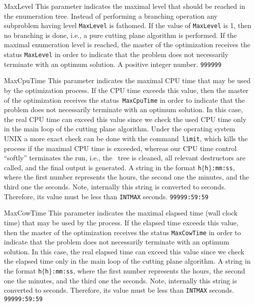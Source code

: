 \parameter
{MaxLevel}
{This parameter indicates the maximal level
 that should be reached in 
 the enumeration tree. Instead of performing a branching operation
 any subproblem having level {\tt MaxLevel} is fathomed.
 If the value of {\tt MaxLevel} is 1, then no branching is done, i.e.,
 a pure cutting plane algorithm is performed. If the maximal
 enumeration level is reached, the master of the optimization
 receives the status {\tt MaxLevel} in order to indicate that the
 problem does not necessarily terminate with an optimum solution.
}
{A positive integer number.}
{{\tt 999999}}

\parameter
{MaxCpuTime}
{This parameter indicates the maximal CPU time
 that may be used by the 
 optimization process. If the
 CPU time exceeds this value, then the master of the optimization
 receives the status~{\tt MaxCpuTime}  in order to indicate that the
 problem does not necessarily terminate with an optimum solution. 
 In this case, the real CPU time
 can exceed this value since we check the used CPU time only in
 the main loop of the cutting plane algorithm. Under the operating
 system UNIX a more exact check can be done with the command~{\tt limit}, 
 which kills the process if the maximal
 CPU time is exceeded, whereas our CPU time control ``softly'' terminates
 the run, i.e., the \bab\ tree is cleaned, all relevant 
 destructors are called, and the final output is generated.
}
{A string in the format {\tt h$\{$h$\}$:mm:ss}, where the first number
 represents the hours, the second one the minutes, and the third
 one the seconds.
 Note, internally this string is converted to seconds. Therefore, its
 value must be less than {\tt INT\underscore MAX} seconds.
}
{{\tt 99999:59:59}}

\parameter
{MaxCowTime}
{This parameter indicates the maximal elapsed time
 (wall clock time) that may be used  by the process. If the
 elapsed time exceeds this value, then the master of the optimization
 receives the status {\tt MaxCowTime} in order to indicate that the
 problem does not necessarily terminate with an optimum solution. 
 In this case, the real elapsed time
 can exceed this value since we check the elapsed time only in
 the main loop of the cutting plane algorithm. 
}
{A string in the format {\tt h$\{$h$\}$:mm:ss}, where the first number
 represents the hours, the second one the minutes, and the third 
 one the seconds.
 Note, internally this string is converted to seconds. Therefore, its
 value must be less than {\tt INT\underscore MAX} seconds.
}
{{\tt 99999:59:59}}

